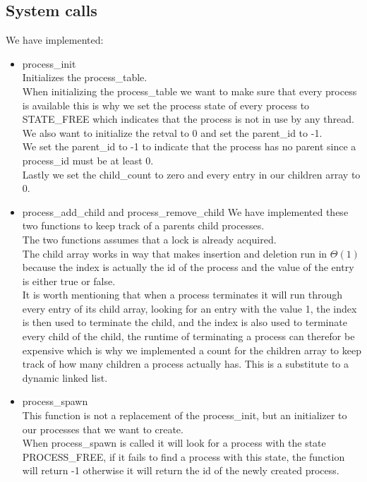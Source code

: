 \documentclass[a4paper,12pt,danish]{report}
\begin{document}
\subsection{System calls}
We have implemented:
\begin{itemize}
  \item{process\_init}
    \\
    Initializes the process\_table.
    \\
    When initializing the process\_table we want to make sure that every process is available this is why we set the process state of every process to STATE\_FREE which indicates that the process is not in use by any thread.
    We also want to initialize the retval to 0 and set the parent\_id to -1.
    \\
    We set the parent\_id to -1 to indicate that the process has no parent since a process\_id must be at least 0.\\
    Lastly we set the child\_count to zero and every entry in our children array to 0.
  \item{process\_add\_child and process\_remove\_child}
  We have implemented these two functions to keep track of a parents child processes.
  \\
  The two functions assumes that a lock is already acquired.
  \\
  The child array works in way that makes insertion and deletion run in $\Theta(1)$ because the index is actually the id of the process and the value of the entry is either true or false.
  \\
  It is worth mentioning that when a process terminates it will run through every entry of its child array, looking for an entry with the value 1, the index is then used to terminate the child, and the index is also used to terminate every child of the child, the runtime of terminating a process can therefor be expensive which is why we implemented a count for the children array to keep track of how many children a process actually has.
  This is a substitute to a dynamic linked list.
  \item{process\_spawn}
  \\
  This function is not a replacement of the process\_init, but an initializer to our processes that we want to create.
  \\
  When process\_spawn is called it will look for a process with the state PROCESS\_FREE, if it fails to find a process with this state, the function will return -1 otherwise it will return the id of the newly created process.

\end{itemize}
\end{document}
